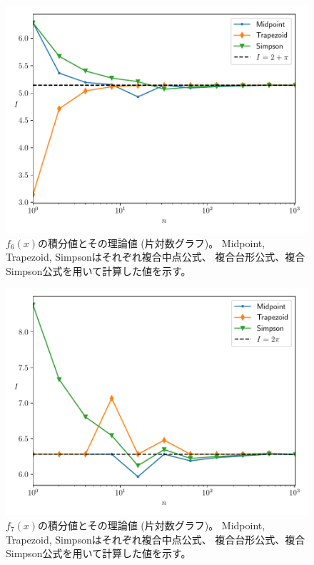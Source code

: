 \documentclass[a4j, titlepage]{jsarticle}
\numberwithin{equation}{section}
\begin{document}
                \begin{figure}[h]
                    \centering
                    \includegraphics[width=0.8\hsize]{kadai2/2/f6.pdf}
                    \caption{
                        $f_6(x)$の積分値とその理論値 (片対数グラフ)。
                        Midpoint, Trapezoid, Simpsonはそれぞれ複合中点公式、
                        複合台形公式、複合Simpson公式を用いて計算した値を示す。
                    }
                    \label{fig:f6}
                \end{figure}
                \begin{figure}[h]
                    \centering
                    \includegraphics[width=0.8\hsize]{kadai2/2/f7.pdf}
                    \caption{
                        $f_7(x)$の積分値とその理論値 (片対数グラフ)。
                        Midpoint, Trapezoid, Simpsonはそれぞれ複合中点公式、
                        複合台形公式、複合Simpson公式を用いて計算した値を示す。
                    }
                    \label{fig:f7}
                \end{figure}
\end{document}
